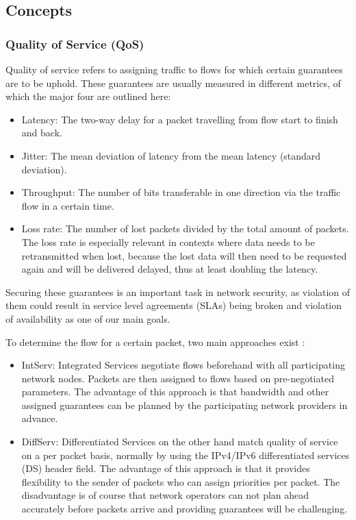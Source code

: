 \documentclass{article}
\begin{document}
\subsection{Concepts}
\subsubsection{Quality of Service (QoS)}
Quality of service \cite{qos, rfc791} refers to assigning traffic to flows for which certain guarantees are to be uphold. These guarantees are usually measured in different metrics, of which the major four are outlined here:
\begin{itemize}
    \item Latency: The two-way delay for a packet travelling from flow start to finish and back.
    \item Jitter: The mean deviation of latency from the mean latency (standard deviation).
    \item Throughput: The number of bits transferable in one direction via the traffic flow in a certain time.
    \item Loss rate: The number of lost packets divided by the total amount of packets. The loss rate is especially relevant in contexts where data needs to be retransmitted when lost, because the lost data will then need to be requested again and will be delivered delayed, thus at least doubling the latency.
\end{itemize}
Securing these guarantees is an important task in network security, as violation of them could result in service level agreements (SLAs) being broken and violation of availability as one of our main goals.

To determine the flow for a certain packet, two main approaches exist \cite{serv}:
\begin{itemize}
    \item IntServ: Integrated Services \cite{rfc1633} negotiate flows beforehand with all participating network nodes. Packets are then assigned to flows based on pre-negotiated parameters. The advantage of this approach is that bandwidth and other assigned guarantees can be planned by the participating network providers in advance.
    \item DiffServ: Differentiated Services \cite{rfc2474} on the other hand match quality of service on a per packet basis, normally by using the IPv4/IPv6 differentiated services (DS) header field. The advantage of this approach is that it provides flexibility to the sender of packets who can assign priorities per packet. The disadvantage is of course that network operators can not plan ahead accurately before packets arrive and providing guarantees will be challenging.
\end{itemize}
\end{document}

